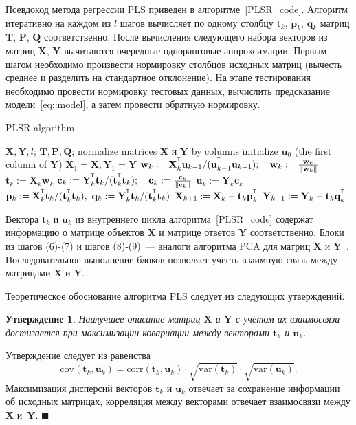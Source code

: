 \documentclass[12pt,twoside]{article}
\newtheorem{statement}{Утверждение}
\newcommand{\bw}{\mathbf{w}}
\newcommand{\bY}{\mathbf{Y}}
\newcommand{\bX}{\mathbf{X}}
\newcommand{\bu}{\mathbf{u}}
\newcommand{\bt}{\mathbf{t}}
\newcommand{\bp}{\mathbf{p}}
\newcommand{\bq}{\mathbf{q}}
\newcommand{\bc}{\mathbf{c}}
\newcommand{\bP}{\mathbf{P}}
\newcommand{\bT}{\mathbf{T}}
\newcommand{\bQ}{\mathbf{Q}}
\newcommand{\T}{^{\text{\tiny\sffamily\upshape\mdseries T}}}
\begin{document}
Псевдокод метода регрессии PLS приведен в алгоритме~\ref{PLSR_code}.
Алгоритм итеративно на каждом из $l$ шагов вычисляет по одному столбцу $\bt_k$, $\bp_k$, $\bq_k$ матриц $\bT$, $\bP$, $\bQ$ соответственно. После вычисления следующего набора векторов из матриц $\bX$, $\bY$ вычитаются очередные одноранговые аппроксимации. 
Первым шагом необходимо произвести нормировку столбцов исходных матриц (вычесть среднее и разделить на стандартное отклонение).
На этапе тестирования необходимо провести нормировку тестовых данных, вычислить предсказание модели~\ref{eq::model}, а затем провести обратную нормировку.

\begin{algorithm}[h]
\caption{PLSR algorithm}
\label{PLSR_code}
\begin{algorithmic}[1]
	\REQUIRE $\bX, \bY, l$;
	\ENSURE $\bT, \bP, \bQ$;
	\STATE normalize matrices $\bX$ и $\bY$ by columns
	\STATE initialize $\bu_0$ (the first column of $\bY$)
	\STATE $\bX_1 = \bX; \bY_1 = \bY$
	\REPEAT
	\vspace{0.1cm}
	\STATE $\bw_k := \bX_k^{\T} \bu_{k-1} / (\bu_{k-1}^{\T} \bu_{k-1}); \quad \bw_k: = \frac{\bw_k}{\| \bw_k \|}$
	\vspace{0.1cm}
	\STATE $\bt_k := \bX_k \bw_k$
	\vspace{0.1cm}
	\STATE $\bc_k := \bY_k^{\T} \bt_k / (\bt_k^{\T} \bt_k); \quad \bc_k: = \frac{\bc_k}{\| \bc_k \|}$
	\vspace{0.1cm}
	\STATE $\bu_k := \bY_k \bc_k$
	\UNTIL{$\bt_k$ stabilizes}
	\vspace{0.1cm}
	\STATE $\bp_k:= \bX_k^{\T}\bt_k/(\bt_k^{\T}\bt_k),\ 
	\bq_k := \bY_k^{\T}\bt_k/(\bt_k^{\T}\bt_k)$
	\vspace{0.2cm}
	\STATE $\bX_{k+1} :=  \bX_k - \bt_k \bp_k^{\T}$
	\vspace{0.2cm}
	\STATE $\bY_{k + 1} :=  \bY_k - \bt_k \bq_k^{\T}$ 
	\ENDFOR
\end{algorithmic}
\end{algorithm}
Вектора $\bt_k$ и $\bu_k$ из внутреннего цикла алгоритма~\ref{PLSR_code}
содержат информацию о матрице объектов $\bX$ и матрице ответов $\bY$ соответственно. 
Блоки из шагов (6)-(7) и шагов (8)-(9)~--- аналоги алгоритма PCA для матриц $\bX$ и $\bY$~\cite{geladi1986partial}. 
Последовательное выполнение блоков позволяет учесть взаимную связь между матрицами $\bX$ и $\bY$.

Теоретическое обоснование алгоритма PLS следует из следующих утверждений.
\begin{statement}
Наилучшее описание матриц $\bX$ и $\bY$ с учётом их взаимосвязи достигается при максимизации ковариации между векторами $\bt_k$ и $\bu_k$. 
\end{statement}
Утверждение следует из равенства
\[
\text{cov} (\bt_k, \bu_k) = \text{corr} (\bt_k, \bu_k) \cdot \sqrt{\text{var}(\bt_k)} \cdot \sqrt{\text{var}(\bu_k)}.
\]
Максимизация дисперсий векторов $\bt_k$ и $\bu_k$ отвечает за сохранение информации об исходных матрицах, 
корреляция между векторами отвечает взаимосвязи между $\bX$ и~$\bY$. $\blacksquare$
\end{document}
